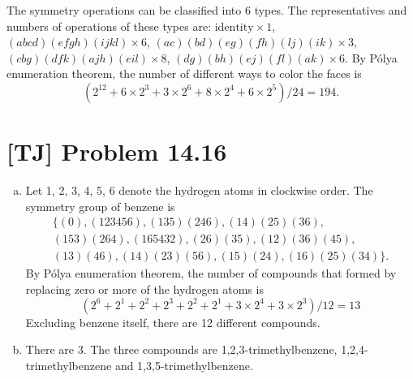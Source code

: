 \documentclass[a4paper,11pt,twocolumn]{article}
\begin{document}
  The symmetry operations can be classified into 6 types. The representatives and numbers of operations of these types are: $\text{identity} \times 1$, $(abcd)(efgh)(ijkl) \times 6$, $(ac)(bd)(eg)(fh)(lj)(ik) \times 3$, $(cbg)(dfk)(ajh)(eil) \times 8$, $(dg)(bh)(ej)(fl)(ak) \times 6$. By P\'{o}lya enumeration theorem, the number of different ways to color the faces is
  $$ (2^12 + 6 \times 2^3 + 3 \times 2^6 + 8 \times 2^4 + 6 \times 2^5) / 24 = 194.$$

  \section{[TJ] Problem 14.16}
  \begin{enumerate}[(a)]
    \item Let 1, 2, 3, 4, 5, 6 denote the hydrogen atoms in clockwise order. The symmetry group of benzene is
        \begin{multline*}
          \{(0), (123456), (135)(246), (14)(25)(36), \\
          (153)(264), (165432), (26)(35), (12)(36)(45), \\
          (13)(46), (14)(23)(56), (15)(24), (16)(25)(34)\}.
        \end{multline*}
        By P\'{o}lya enumeration theorem, the number of compounds that formed by replacing zero or more of the hydrogen atoms is
        $$ (2^6 + 2^1 + 2^2 + 2^3 + 2^2 + 2^1 + 3 \times 2^4 + 3 \times 2^3) / 12 = 13 $$
        Excluding benzene itself, there are 12 different compounds.
    \item There are 3. The three compounds are 1,2,3-trimethylbenzene, 1,2,4-trimethylbenzene and 1,3,5-trimethylbenzene.
  \end{enumerate}
\end{document}
